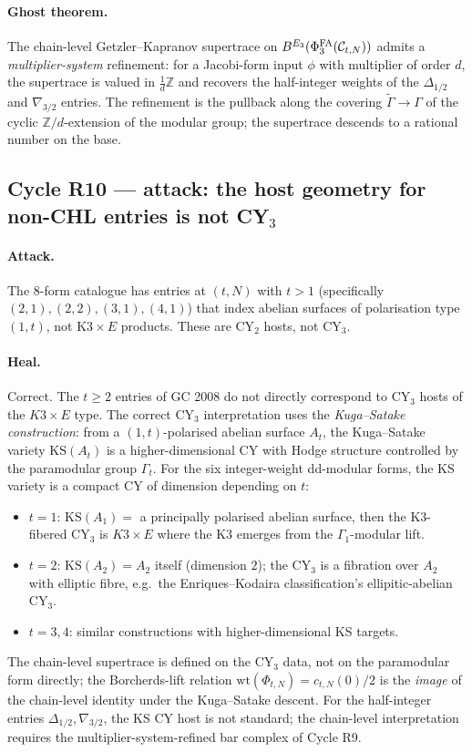 \paragraph{Ghost theorem.} The chain-level Getzler--Kapranov supertrace
on $B^{E_{3}}(\Phi^{\mathrm{FA}}_3(\mathcal C_{t, N}))$ admits a \emph{multiplier-system}
refinement: for a Jacobi-form input $\phi$ with multiplier of order
$d$, the supertrace is valued in $\tfrac{1}{d}\mathbb{Z}$ and recovers
the half-integer weights of the $\Delta_{1/2}$ and $\nabla_{3/2}$
entries. The refinement is the pullback along the covering
$\widetilde{\Gamma} \to \Gamma$ of the cyclic $\mathbb{Z}/d$-extension
of the modular group; the supertrace descends to a rational number on
the base.

\subsection*{Cycle R10 --- attack: the host geometry for non-CHL
entries is not CY$_3$}

\paragraph{Attack.} The 8-form catalogue has entries at $(t, N)$ with
$t > 1$ (specifically $(2,1), (2,2), (3,1), (4,1)$) that index abelian
surfaces of polarisation type $(1, t)$, not K$3 \times E$ products.
These are CY$_2$ hosts, not CY$_3$.

\paragraph{Heal.} Correct. The $t \geq 2$ entries of GC 2008 do not
directly correspond to CY$_3$ hosts of the $K3 \times E$ type. The
correct CY$_3$ interpretation uses the \emph{Kuga--Satake construction}:
from a $(1, t)$-polarised abelian surface $A_t$, the Kuga--Satake
variety $\mathrm{KS}(A_t)$ is a higher-dimensional CY with Hodge
structure controlled by the paramodular group $\Gamma_t$. For the six
integer-weight dd-modular forms, the KS variety is a compact CY of
dimension depending on $t$:
\begin{itemize}
\item $t = 1$: $\mathrm{KS}(A_1) = $ a principally polarised abelian
surface, then the K$3$-fibered CY$_3$ is $K3 \times E$ where the K$3$
emerges from the $\Gamma_1$-modular lift.
\item $t = 2$: $\mathrm{KS}(A_2) = A_2$ itself (dimension $2$); the
CY$_3$ is a fibration over $A_2$ with elliptic fibre, e.g.\ the
Enriques--Kodaira classification's ellipitic-abelian CY$_3$.
\item $t = 3, 4$: similar constructions with higher-dimensional KS
targets.
\end{itemize}
The chain-level supertrace is defined on the CY$_3$ data, not on the
paramodular form directly; the Borcherds-lift relation
$\mathrm{wt}(\Phi_{t, N}) = c_{t, N}(0)/2$ is the \emph{image} of the
chain-level identity under the Kuga--Satake descent. For the
half-integer entries $\Delta_{1/2}, \nabla_{3/2}$, the KS CY host is
not standard; the chain-level interpretation requires the
multiplier-system-refined bar complex of Cycle R9.

